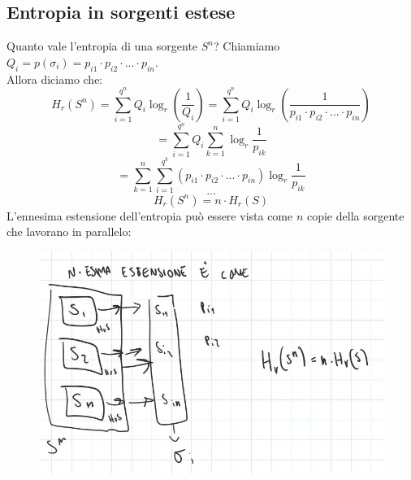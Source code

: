 \subsection*{Entropia in sorgenti estese}
Quanto vale l'entropia di una sorgente $S^n$?
Chiamiamo $Q_i = p(\sigma_i) = p_{i1} \cdot p_{i2} \cdot ... \cdot p_{in}$.\\
Allora diciamo che:
\begin{equation*}
H_r(S^n) = \sum_{i=1}^{q^n}Q_i\log_r(\frac{1}{Q_i}) = \sum_{i=1}^{q^n}Q_i\log_r(\frac{1}{p_{i1} \cdot p_{i2} \cdot... \cdot p_{in}})
\end{equation*}
\begin{equation*}
= \sum_{i=1}^{q^n}Q_i\sum_{k=1}^n\log_r\frac{1}{p_{ik}}
\end{equation*}
\begin{equation*}
= \sum_{k=1}^{n}\sum_{i=1}^{q^k}(p_{i1} \cdot p_{i2} \cdot ... \cdot p_{in})\log_r\frac{1}{p_{ik}}
\end{equation*}
\begin{equation*}
...
\end{equation*}
\begin{equation*}
H_r(S^n) = n \cdot H_r(S)
\end{equation*}
L'ennesima estensione dell'entropia può essere vista come $n$ copie della sorgente che lavorano in parallelo:
\begin{figure}[h]
	\centering
	\includegraphics[width=0.72\linewidth]{immagini/img25}
\end{figure}











